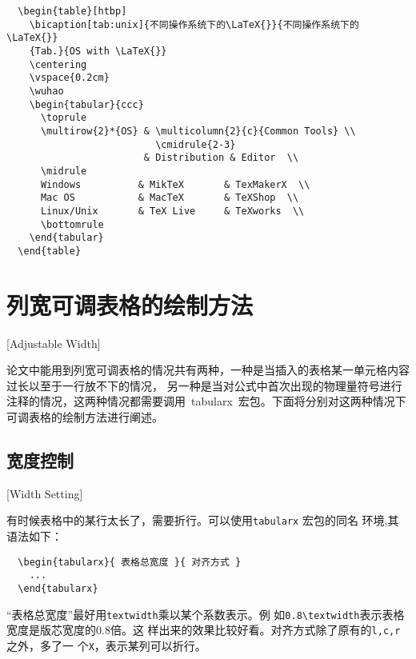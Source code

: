 \begin{lstlisting}
  \begin{table}[htbp]
    \bicaption[tab:unix]{不同操作系统下的\LaTeX{}}{不同操作系统下的\LaTeX{}}
    {Tab.}{OS with \LaTeX{}}
    \centering
    \vspace{0.2cm}
    \wuhao
    \begin{tabular}{ccc}
      \toprule
      \multirow{2}*{OS} & \multicolumn{2}{c}{Common Tools} \\
                          \cmidrule{2-3}
                        & Distribution & Editor  \\
      \midrule
      Windows          & MikTeX       & TexMakerX  \\
      Mac OS           & MacTeX       & TeXShop  \\
      Linux/Unix       & TeX Live     & TeXworks  \\
      \bottomrule
    \end{tabular}
  \end{table}
\end{lstlisting}

\section{列宽可调表格的绘制方法}[Adjustable Width]

论文中能用到列宽可调表格的情况共有两种，一种是当插入的表格某一单元格内容过长以至于一行放不下的情况，
另一种是当对公式中首次出现的物理量符号进行注释的情况，这两种情况都需要调用~tabularx~宏包。下面将分别对这两种情况下可调表格的绘制方法进行阐述。

\subsection{宽度控制}[Width Setting]

有时候表格中的某行太长了，需要折行。可以使用\texttt{tabularx} 宏包的同名
环境,其语法如下：

\begin{lstlisting}
  \begin{tabularx}{ 表格总宽度 }{ 对齐方式 }
    ...
  \end{tabularx}
\end{lstlisting}

“表格总宽度”最好用\texttt{textwidth}乘以某个系数表示。例
如\texttt{0.8\textbackslash{textwidth}}表示表格宽度是版芯宽度的0.8倍。这
样出来的效果比较好看。对齐方式除了原有的\texttt{l,c,r}之外，多了一
个\texttt{X}，表示某列可以折行。

